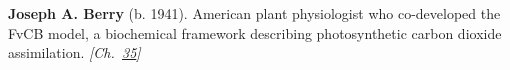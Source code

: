 \textbf{Joseph A. Berry} (b. 1941). American plant physiologist who co-developed the FvCB model, a biochemical framework describing photosynthetic carbon dioxide assimilation. \emph{[Ch.~\hyperref[ch:treesfromair]{35}]}

